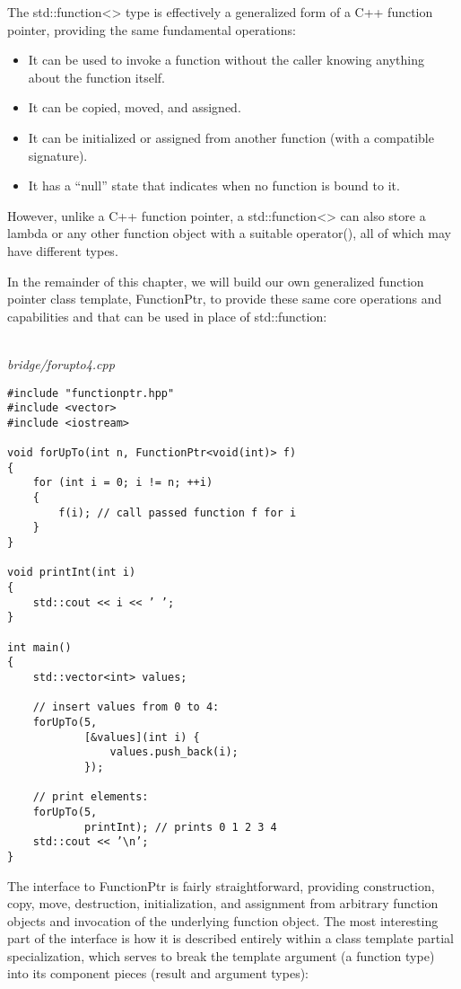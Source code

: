 The std::function<> type is effectively a generalized form of a C++ function pointer, providing the same fundamental operations:

\begin{itemize}
\item 
It can be used to invoke a function without the caller knowing anything about the function itself.

\item 
It can be copied, moved, and assigned.


\item 
It can be initialized or assigned from another function (with a compatible signature).


\item 
It has a “null” state that indicates when no function is bound to it.
\end{itemize}

However, unlike a C++ function pointer, a std::function<> can also store a lambda or any other function object with a suitable operator(), all of which may have different types.

In the remainder of this chapter, we will build our own generalized function pointer class template, FunctionPtr, to provide these same core operations and capabilities and that can be used in place of std::function:

\hspace*{\fill} \\ %
\noindent
\textit{bridge/forupto4.cpp}
\begin{lstlisting}[style=styleCXX]
#include "functionptr.hpp"
#include <vector>
#include <iostream>

void forUpTo(int n, FunctionPtr<void(int)> f)
{
	for (int i = 0; i != n; ++i)
	{
		f(i); // call passed function f for i
	}
}

void printInt(int i)
{
	std::cout << i << ’ ’;
}

int main()
{
	std::vector<int> values;
	
	// insert values from 0 to 4:
	forUpTo(5,
			[&values](int i) {
				values.push_back(i);
			});
		
	// print elements:
	forUpTo(5,
			printInt); // prints 0 1 2 3 4
	std::cout << ’\n’;
}
\end{lstlisting}

The interface to FunctionPtr is fairly straightforward, providing construction, copy, move, destruction, initialization, and assignment from arbitrary function objects and invocation of the underlying function object. The most interesting part of the interface is how it is described entirely within a class template partial specialization, which serves to break the template argument (a function type) into its component pieces (result and argument types):

